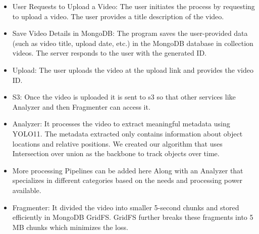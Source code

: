 \documentclass[conference]{IEEEtran}
\begin{document}
\begin{itemize}[itemsep=5pt]
    \item User Requests to Upload a Video: The user initiates the process by requesting to upload a video. The user provides a title description of the video.
    \item Save Video Details in MongoDB\cite{mongodb}: The program saves the user-provided data (such as video title, upload date, etc.) in the MongoDB\cite{mongodb} database in collection videos. The server responds to the user with the generated ID.
    \item Upload: The user uploads the video at the upload link and provides the video ID.
    \item S3: Once the video is uploaded it is sent to s3 so that other services like Analyzer and then Fragmenter can access it.
    
    \item Analyzer: It processes the video to extract meaningful metadata using YOLO11. The metadata extracted only contains information about object locations and relative positions. We created our algorithm that uses Intersection over union as the backbone to track objects over time.
    \item More processing Pipelines can be added here Along with an Analyzer that specializes in different categories based on the needs and processing power available.
    \item Fragmenter: It divided the video into smaller 5-second chunks and stored efficiently in MongoDB GridFS\cite{mongodb_gridfs}. GridFS further breaks these fragments into 5 MB chunks which minimizes the loss.
\end{itemize}
\end{document}
